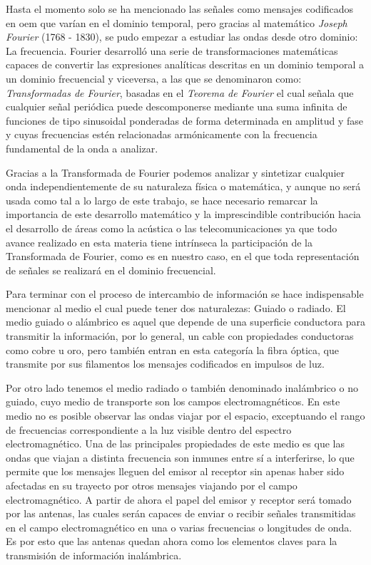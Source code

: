 \par Hasta el momento solo se ha mencionado las señales como mensajes codificados en \gls{oem} que varían en el dominio temporal, pero gracias al matemático \textit{Joseph Fourier} (1768 - 1830), se pudo empezar a estudiar las ondas desde otro dominio: La frecuencia. Fourier desarrolló una serie de transformaciones matemáticas capaces de convertir las expresiones analíticas descritas en un dominio temporal a un dominio frecuencial y viceversa, a las que se denominaron como: \textit{Transformadas de Fourier}, basadas en el \textit{Teorema de Fourier} el cual señala que cualquier señal periódica puede descomponerse mediante una suma infinita de funciones de tipo sinusoidal ponderadas de forma determinada en amplitud y fase y cuyas frecuencias estén relacionadas armónicamente con la frecuencia fundamental de la onda a analizar. 
\\
\par Gracias a la Transformada de Fourier podemos analizar y sintetizar cualquier onda independientemente de su naturaleza física o matemática, y aunque no será usada como tal a lo largo de este trabajo, se hace necesario remarcar la importancia de este desarrollo matemático y la imprescindible contribución hacia el desarrollo de áreas como la acústica o las telecomunicaciones ya que todo avance realizado en esta materia tiene intrínseca la participación de la Transformada de Fourier, como es en nuestro caso, en el que toda representación de señales se realizará en el dominio frecuencial. 
\\
\par Para terminar con el proceso de intercambio de información se hace indispensable mencionar al medio el cual puede tener dos naturalezas: Guiado o radiado. El medio guiado o alámbrico es aquel que depende de una superficie conductora para transmitir la información, por lo general, un cable con propiedades conductoras como cobre u oro, pero también entran en esta categoría la fibra óptica, que transmite por sus filamentos los mensajes codificados en impulsos de luz.  
\\
\par Por otro lado tenemos el medio radiado o también denominado inalámbrico o no guiado, cuyo medio de transporte son los campos electromagnéticos. En este medio no es posible observar las ondas viajar por el espacio, exceptuando el rango de frecuencias correspondiente a la luz visible dentro del espectro electromagnético. Una de las principales propiedades de este medio es que las ondas que viajan a distinta frecuencia son inmunes entre sí a interferirse, lo que permite que los mensajes lleguen del emisor al receptor sin apenas haber sido afectadas en su trayecto por otros mensajes viajando por el campo electromagnético. A partir de ahora el papel del emisor y receptor será tomado por las antenas, las cuales serán capaces de enviar o recibir señales transmitidas en el campo electromagnético en una o varias frecuencias o longitudes de onda. Es por esto que las antenas quedan ahora como los elementos claves para la transmisión de información inalámbrica. 
